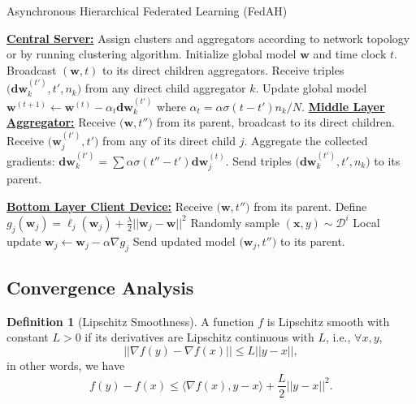 \documentclass[10pt,twocolumn,letterpaper]{article}
\theoremstyle{definition}
\newtheorem{definition}{Definition}
\newlength\myindent %
\newcommand\bindent{%
  \begingroup %
  \setlength{\itemindent}{\myindent} %
  \addtolength{\algorithmicindent}{\myindent} %
}
\newcommand\eindent{\endgroup} %
\begin{document}
\begin{algorithm}[htb!]
\caption{Asynchronous Hierarchical Federated Learning (FedAH)}
\label{alg:fedah}
\begin{algorithmic}[1]
\footnotesize
\STATE \underline{\textbf{Central Server:}}
    \STATE Assign clusters and aggregators according to network topology or by running clustering algorithm.
    \STATE Initialize global model $\mathbf{w}$ and time clock $t$.
    \STATE Broadcast $(\mathbf{w}, t)$ to its direct children aggregators. 
    \STATE Receive triples $\big(\mathbf{dw}_k^{(t')}, t', n_k\big)$ from any direct child aggregator $k$.
    \STATE Update global model %
    $\mathbf{w}^{(t+1)}  \leftarrow \mathbf{w}^{(t)} - \alpha_{t} \mathbf{dw}^{(t')}_{k}$  where $\alpha_{t} = \alpha \sigma(t-t') n_k / N$.
\ENDFOR
\STATE \underline{\textbf{Middle Layer Aggregator:}}
    \STATE Receive $\big(\mathbf{w}, t''\big)$ from its parent, broadcast to its direct children.
    \STATE Receive $\big(\mathbf{w}_j^{(t')}, t'\big)$ from any of its direct child $j$.
    \STATE Aggregate the collected gradients: $ \mathbf{dw}_k^{(t')} = \sum \alpha \sigma(t''-t') \mathbf{dw}_j^{(t)}$.
    \STATE Send triples $\big(\mathbf{dw}_k^{(t')}, t', n_k\big)$ to its parent.
    
\STATE \underline{\textbf{Bottom Layer Client Device:}}
    \STATE Receive $\big(\mathbf{w}, t''\big)$ from its parent.
    \STATE Define $g_j(\mathbf{w}_j) = \ell_j(\mathbf{w}_j) + \frac{\lambda}{2} || \mathbf{w}_j - \mathbf{w} ||^2 $
        \STATE Randomly sample $(\mathbf{x}, y) \sim \mathcal{D}^i$
        \STATE Local update $\mathbf{w}_j \leftarrow \mathbf{w}_j - \alpha \nabla g_j$
    \ENDFOR
    \STATE Send updated model $\big(\mathbf{w}_j, t''\big)$ to its parent.


\end{algorithmic}
\end{algorithm}

\subsection{Convergence Analysis}

\begin{definition}[Lipschitz Smoothness]
A function $f$ is Lipschitz smooth with constant $L>0$ if its derivatives are Lipschitz continuous with $L$, i.e., $\forall x, y$, 
\[ || \nabla f(y) - \nabla f(x) || \le L || y - x ||, \]
in other words, we have
\[ f(y) - f(x) \le \langle \nabla f(x), y-x \rangle + \frac{L}{2} ||y-x||^2. \]
\end{definition}
\end{document}
